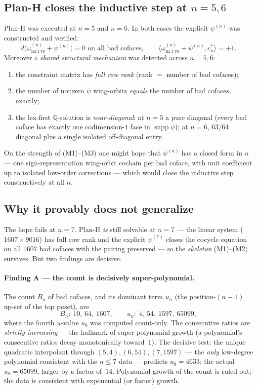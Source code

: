 \documentclass[11pt,reqno]{amsart}
\theoremstyle{plain}
\theoremstyle{definition}
\newcommand{\Q}{\mathbb{Q}}
\newcommand{\cstar}[1]{c^{*}_{#1}}
\begin{document}
\subsection{Plan-H closes the inductive step at $n=5,6$}\label{ssec:8.2}
Plan-H was executed at $n=5$ and $n=6$. In both cases the explicit
$\psi^{(n)}$ was constructed and verified:
\[
  d\bigl(\omega^{(n)}_{\mathrm{na\ddot\imath ve}}+\psi^{(n)}\bigr)=0
  \text{ on all bad cofaces},\qquad
  \langle\omega^{(n)}_{\mathrm{na\ddot\imath ve}}+\psi^{(n)},\cstar n\rangle=+1.
\]
Moreover a \emph{shared structural mechanism} was detected across
$n=5,6$:
\begin{enumerate}[leftmargin=2em,label=(M\arabic*)]
  \item the constraint matrix has \emph{full row rank} (rank
        $=$ number of bad cofaces);
  \item the number of nonzero $\psi$ wing-orbits \emph{equals} the
        number of bad cofaces, exactly;
  \item the lex-first $\Q$-solution is \emph{near-diagonal}: at $n=5$ a
        pure diagonal (every bad coface has exactly one codimension-$1$
        face in $\operatorname{supp}\psi$); at $n=6$, $63/64$ diagonal
        plus a single isolated off-diagonal entry.
\end{enumerate}
On the strength of (M1)--(M3) one might hope that $\psi^{(n)}$ has a
closed form in $n$ --- one sign-representation wing-orbit cochain per
bad coface, with unit coefficient up to isolated low-order corrections
--- which would close the inductive step constructively at all $n$.

\subsection{Why it provably does not generalize}\label{ssec:8.3}
The hope fails at $n=7$. Plan-H \emph{is} still solvable at $n=7$ ---
the linear system ($1607\times9016$) has full row rank and the explicit
$\psi^{(7)}$ closes the cocycle equation on all $1607$ bad cofaces with
the pairing preserved --- so the \emph{skeleton} (M1)--(M2) survives.
But two findings are decisive.

\paragraph{Finding A --- the count is decisively super-polynomial.}
The count $B_n$ of bad cofaces, and its dominant term $u_n$ (the
position-$(n-1)$ up-set of the top poset), are
\[
  B_n:\ 10,\ 64,\ 1607,\qquad
  u_n:\ 4,\ 54,\ 1597,\ 65099,
\]
where the fourth $u$-value $u_8$ was computed count-only. The
consecutive ratios are \emph{strictly increasing} --- the hallmark of
super-polynomial growth (a polynomial's consecutive ratios decay
monotonically toward~$1$). The decisive test: the unique quadratic
interpolant through $(5,4),(6,54),(7,1597)$ --- the \emph{only}
low-degree polynomial consistent with the $n\le7$ data --- predicts
$u_8=4633$; the actual $u_8=65099$, larger by a factor of~$14$.
Polynomial growth of the count is ruled out; the data is consistent
with exponential (or faster) growth.
\end{document}
